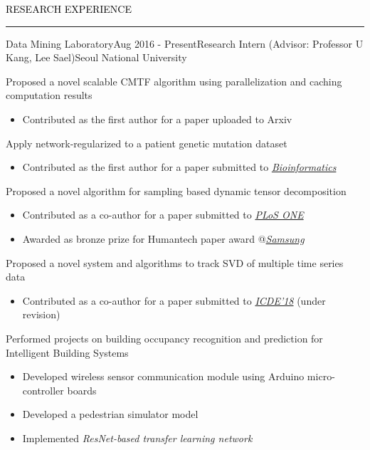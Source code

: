 \documentclass{resume} %
\renewenvironment{rSection}[1]{
	\sectionskip
	\textcolor{Black}{\MakeUppercase{#1}}
	\sectionlineskip
	\hrule
	\begin{list}{}{
			\setlength{\leftmargin}{1.5em}
		}
		\item[]
	}{
	\end{list}
}
\begin{document}
\begin{rSection}{Research Experience}
		\vspace{1mm}		
\begin{rSubsection}{Data Mining Laboratory}{Aug 2016 - Present}{Research Intern (Advisor: Professor U Kang, Lee Sael)}{Seoul National University}
	\item Proposed a novel scalable CMTF algorithm using parallelization and caching computation results
	\begin{itemize}
		\vspace*{-2.5mm}
		\item Contributed as the first author for a paper uploaded to Arxiv
	\end{itemize}
	\item Apply network-regularized to a patient genetic mutation dataset
	\begin{itemize}
		\vspace*{-2.0mm}
		\item Contributed as the first author for a paper submitted to \href{https://academic.oup.com/bioinformatics}{\textit{Bioinformatics}}
	\end{itemize}
	\item Proposed a novel algorithm for sampling based dynamic tensor decomposition
	\begin{itemize}
		\vspace*{-2.0mm}
		\item Contributed as a co-author for a paper submitted to \href{http://journals.plos.org/plosone/}{\textit{PLoS ONE}}
		\vspace*{-2.0mm}
		\item Awarded as bronze prize for Humantech paper award @\em{\href{https://humantech.samsung.com/saitext/index.jsp}{Samsung}}\em
	\end{itemize}
	\item Proposed a novel system and algorithms to track SVD of multiple time series data
	\begin{itemize}
		\vspace*{-2.0mm}
		\item Contributed as a co-author for a paper submitted to \href{https://icde2018.org/}{\textit{ICDE'18}} (under revision)
	\end{itemize}
	\item Performed projects on building occupancy recognition and prediction for Intelligent Building Systems
	\begin{itemize}
		\vspace*{-2.0mm}
		\item Developed wireless sensor communication module using Arduino micro-controller boards
		\vspace*{-2.0mm}
		\item Developed a pedestrian simulator model
		\vspace*{-2.0mm}
		\item Implemented \em{ResNet}\em-based transfer learning network
	\end{itemize}
\end{rSubsection}


\end{rSection}
\end{document}
